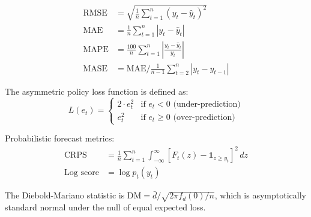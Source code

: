 \documentclass[12pt,a4paper]{article}
\begin{document}
\begin{align}
\text{RMSE} &= \sqrt{\frac{1}{n} \sum_{t=1}^{n} (y_t - \hat{y}_t)^2} \\
\text{MAE} &= \frac{1}{n} \sum_{t=1}^{n} |y_t - \hat{y}_t| \\
\text{MAPE} &= \frac{100}{n} \sum_{t=1}^{n} \left| \frac{y_t - \hat{y}_t}{y_t} \right| \\
\text{MASE} &= \text{MAE} \bigg/ \frac{1}{n-1} \sum_{t=2}^{n} |y_t - y_{t-1}|
\end{align}

The asymmetric policy loss function is defined as:
\[
L(e_t) = \begin{cases} 2 \cdot e_t^2 & \text{if } e_t < 0 \text{ (under-prediction)} \\ e_t^2 & \text{if } e_t \geq 0 \text{ (over-prediction)} \end{cases}
\]

Probabilistic forecast metrics:
\begin{align}
\text{CRPS} &= \frac{1}{n} \sum_{t=1}^{n} \int_{-\infty}^{\infty} [F_t(z) - \mathbf{1}_{z \geq y_t}]^2 \, dz \\
\text{Log score} &= \log p_t(y_t)
\end{align}

The Diebold-Mariano statistic is $\text{DM} = \bar{d} / \sqrt{2\pi f_d(0) / n}$, which is asymptotically standard normal under the null of equal expected loss.
\end{document}
